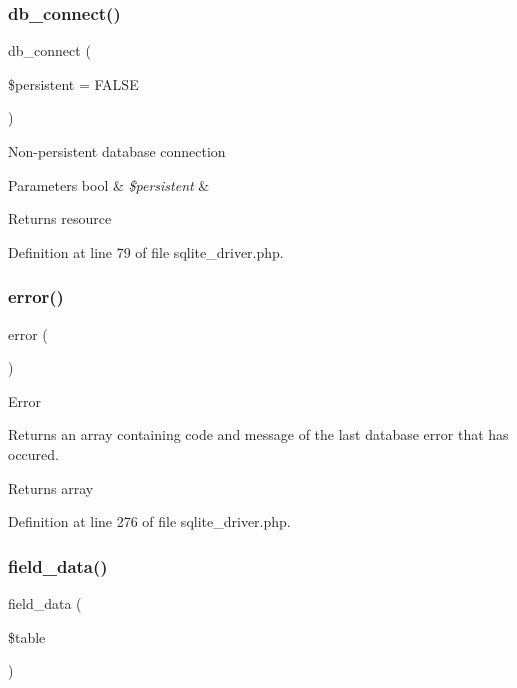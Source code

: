 \subsubsection{\texorpdfstring{db\_connect()}{db\_connect()}}
{\footnotesize\ttfamily db\+\_\+connect (\begin{DoxyParamCaption}\item[{}]{\$persistent = {\ttfamily FALSE} }\end{DoxyParamCaption})}

Non-\/persistent database connection


\begin{DoxyParams}[1]{Parameters}
bool & {\em \$persistent} & \\
\hline
\end{DoxyParams}
\begin{DoxyReturn}{Returns}
resource 
\end{DoxyReturn}


Definition at line 79 of file sqlite\+\_\+driver.\+php.

\mbox{\label{class_c_i___d_b__sqlite__driver_a43b8d30b879d4f09ceb059b02af2bc02}} 
\subsubsection{\texorpdfstring{error()}{error()}}
{\footnotesize\ttfamily error (\begin{DoxyParamCaption}{ }\end{DoxyParamCaption})}

Error

Returns an array containing code and message of the last database error that has occured.

\begin{DoxyReturn}{Returns}
array 
\end{DoxyReturn}


Definition at line 276 of file sqlite\+\_\+driver.\+php.

\mbox{\label{class_c_i___d_b__sqlite__driver_a90355121e1ed009e0efdbd544ab56efa}} 
\subsubsection{\texorpdfstring{field\_data()}{field\_data()}}
{\footnotesize\ttfamily field\+\_\+data (\begin{DoxyParamCaption}\item[{}]{\$table }\end{DoxyParamCaption})}


